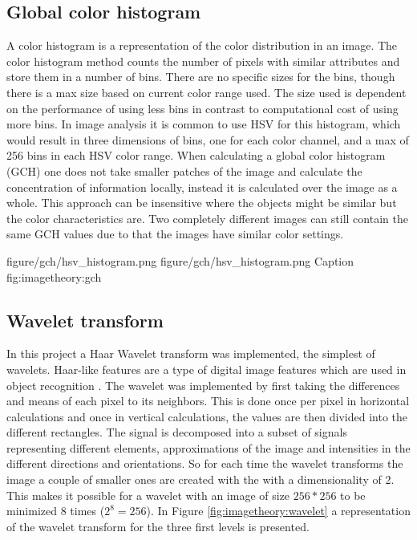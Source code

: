 \subsection{Global color histogram}
\label{sec:gch_feature}

A color histogram is a representation of the color distribution in an image. The color histogram method counts the number of pixels with similar attributes and store them in a number of bins. There are no specific sizes for the bins, though there is a max size based on current color range used. The size used is dependent on the performance of using less bins in contrast to computational cost of using more bins. In image analysis it is common to use HSV for this histogram, which would result in three dimensions of bins, one for each color channel, and a max of 256 bins in each HSV color range. When calculating a global color histogram (GCH) one does not take smaller patches of the image and calculate the concentration of information locally, instead it is calculated over the image as a whole. This approach can be insensitive where the objects might be similar but the color characteristics are. Two completely different images can still contain the same GCH values due to that the images have similar color settings.

\twofigure
{figure/gch/hsv_histogram.png}
{figure/gch/hsv_histogram.png}
{Caption}
{fig:imagetheory:gch} 

\subsection{Wavelet transform}
\label{sec:wlt_feature}

In this project a Haar Wavelet transform was implemented, the simplest of wavelets. Haar-like features are a type of digital image features which are used in object recognition \cite{pavani2010haar}. The wavelet was implemented by first taking the differences and means of each pixel to its neighbors. This is done once per pixel in horizontal calculations and once in vertical calculations, the values are then divided into the different rectangles. The signal is decomposed into a subset of signals representing different elements, approximations of the image and intensities in the different directions and orientations. So for each time the wavelet transforms the image a couple of smaller ones are created with the with a dimensionality of 2. This makes it possible for a wavelet with an image of size $256*256$ to be minimized 8 times ($2^8 = 256$). In Figure \ref{fig:imagetheory:wavelet} a representation of the wavelet transform for the three first levels is presented.

